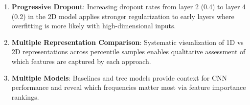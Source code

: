 \begin{enumerate}
    \item \textbf{Progressive Dropout}: Increasing dropout rates from layer 2 (0.4) to layer 4 (0.2) in the 2D model 
    applies stronger regularization to early layers where overfitting is more likely with high-dimensional inputs.
    
    \item \textbf{Multiple Representation Comparison}: Systematic visualization of 1D vs 2D representations across percentile 
    samples enables qualitative assessment of which features are captured by each approach.
    
    \item \textbf{Multiple Models}: Baselines and tree models provide context for CNN performance and reveal which frequencies 
    matter most via feature importance rankings.
\end{enumerate}